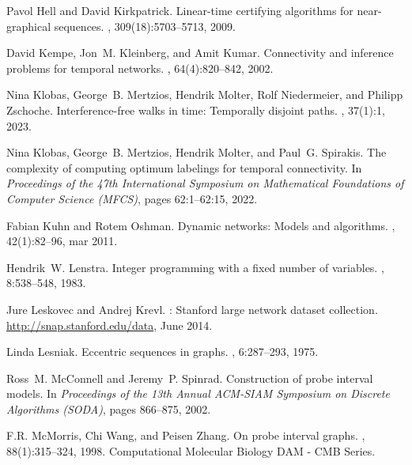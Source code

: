 \documentclass[a4paper,UKenglish,cleveref, autoref, thm-restate]{lipics-v2021}
\begin{document}
\begin{thebibliography}{10}
	Pavol Hell and David Kirkpatrick.
	\newblock Linear-time certifying algorithms for near-graphical sequences.
	, 309(18):5703--5713, 2009.
	
	David Kempe, Jon~M. Kleinberg, and Amit Kumar.
	\newblock Connectivity and inference problems for temporal networks.
	, 64(4):820--842, 2002.
	
	Nina Klobas, George~B. Mertzios, Hendrik Molter, Rolf Niedermeier, and Philipp
	Zschoche.
	\newblock Interference-free walks in time: Temporally disjoint paths.
	, 37(1):1, 2023.
	
	Nina Klobas, George~B. Mertzios, Hendrik Molter, and Paul~G. Spirakis.
	\newblock The complexity of computing optimum labelings for temporal
	connectivity.
	\newblock In {\em Proceedings of the 47th International Symposium on
		Mathematical Foundations of Computer Science (MFCS)}, pages 62:1--62:15,
	2022.
	
	Fabian Kuhn and Rotem Oshman.
	\newblock Dynamic networks: Models and algorithms.
	, 42(1):82–96, mar 2011.
	
	Hendrik~W. Lenstra.
	\newblock Integer programming with a fixed number of variables.
	, 8:538--548, 1983.
	
	Jure Leskovec and Andrej Krevl.
	: {Stanford} large network dataset collection.
	\newblock \url{http://snap.stanford.edu/data}, June 2014.
	
	Linda Lesniak.
	\newblock Eccentric sequences in graphs.
	, 6:287--293, 1975.
	
	Ross~M. McConnell and Jeremy~P. Spinrad.
	\newblock Construction of probe interval models.
	\newblock In {\em Proceedings of the 13th Annual {ACM-SIAM} Symposium on
		Discrete Algorithms (SODA)}, pages 866--875, 2002.
	
	F.R. McMorris, Chi Wang, and Peisen Zhang.
	\newblock On probe interval graphs.
	, 88(1):315--324, 1998.
	\newblock Computational Molecular Biology DAM - CMB Series.
	

\end{thebibliography}
\end{document}
